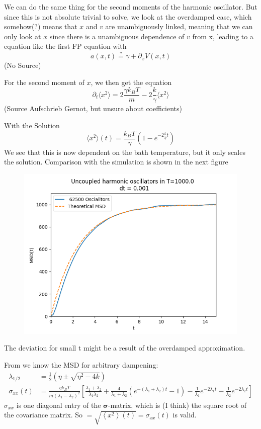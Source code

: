 	We can do the same thing for the second moments of the harmonic oscillator. But since this is not absolute trivial to solve, we look at the overdamped case, which somehow(?) means that $x$ and $v$ are unambiguously linked, meaning that we can only look at $x$ since there is a unambiguous dependence of $v$ from x, leading to a equation like the first FP equation with
	\begin{equation}
		a(x,t) \overset{?}{=}	\gamma + \partial_x V(x, t)
	\end{equation}
	(No Source)
	
	For the second moment of $x$, we then get the equation
	\begin{equation}
		\partial_t \langle x^2 \rangle =	2 \frac{\gamma k_B T}{m} - 2 \frac{k}{\gamma} \langle x^2 \rangle
	\end{equation}
	(Source Aufschrieb Gernot, but unsure about coefficients)
	
	With the Solution
	\begin{equation}
		\langle x^2 \rangle (t) =	\frac{k_B T}{\gamma} \left(1 - e^{-2 \frac{k}{\eta} t}\right)
	\end{equation}
	We see that this is now dependent on the bath temperature, but it only scales the solution. Comparison with the simulation is shown in the next figure
	\begin{figure}[htp]
		\centering
		\includegraphics[width=12cm]{graphics/convharmonicmsd.png}
	\end{figure}
	The deviation for small t might be a result of the overdamped approximation.
	
	From \cite{risken1996fokker} we know the MSD for arbitrary dampening:
	\begin{align}
		\lambda_{1/2} &=	\frac{1}{2} \left(\eta \pm \sqrt{\eta^2 - 4 k}\right) \\
		\sigma_{xx}(t) &=	\frac{\eta {k_B T}}{m (\lambda_1 - \lambda_2)^2} \left[ \frac{\lambda_1 + \lambda_2}{\lambda_1 \lambda_2} + \frac{4}{\lambda_1 + \lambda_2} \left(e^{- (\lambda_1 + \lambda_2) t} - 1\right) - \frac{1}{\lambda_1} e^{-2\lambda_1 t} - \frac{1}{\lambda_2} e^{- 2 \lambda_2 t}\right]
	\end{align}
	$\sigma_{xx}$ is one diagonal entry of the $\boldsymbol{\sigma}$-matrix, which is (I think) the square root of the covariance matrix. So $=	\sqrt{\left \langle x^2\right \rangle (t)} = \sigma_{xx}(t)$ is valid.
	
